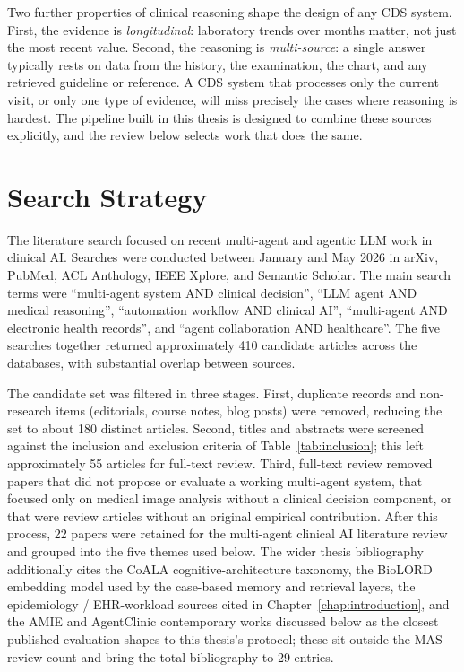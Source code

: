 Two further properties of clinical reasoning shape the design of any CDS
system. First, the evidence is \emph{longitudinal}: laboratory trends over
months matter, not just the most recent value. Second, the reasoning is
\emph{multi-source}: a single answer typically rests on data from the history,
the examination, the chart, and any retrieved guideline or reference. A CDS
system that processes only the current visit, or only one type of evidence,
will miss precisely the cases where reasoning is hardest. The pipeline built
in this thesis is designed to combine these sources explicitly, and the
review below selects work that does the same.

\FloatBarrier
\section{Search Strategy}
\label{sec:search}

The literature search focused on recent multi-agent and agentic LLM work in
clinical AI. Searches were conducted between January and May 2026 in arXiv,
PubMed, ACL Anthology, IEEE Xplore, and Semantic Scholar. The main search
terms were ``multi-agent system AND clinical decision'', ``LLM agent AND
medical reasoning'', ``automation workflow AND clinical AI'', ``multi-agent
AND electronic health records'', and ``agent collaboration AND healthcare''.
The five searches together returned approximately 410 candidate articles
across the databases, with substantial overlap between sources.

The candidate set was filtered in three stages. First, duplicate records and
non-research items (editorials, course notes, blog posts) were removed,
reducing the set to about 180 distinct articles. Second, titles and abstracts
were screened against the inclusion and exclusion criteria of
Table~\ref{tab:inclusion}; this left approximately 55 articles for full-text
review. Third, full-text review removed papers that did not propose or
evaluate a working multi-agent system, that focused only on medical image
analysis without a clinical decision component, or that were review articles
without an original empirical contribution. After this process, 22 papers
were retained for the multi-agent clinical AI literature review and
grouped into the five themes used below. The wider thesis bibliography
additionally cites the CoALA cognitive-architecture taxonomy, the
BioLORD embedding model used by the case-based memory and retrieval
layers, the epidemiology / EHR-workload sources cited in
Chapter~\ref{chap:introduction}, and the AMIE and AgentClinic
contemporary works discussed below as the closest published evaluation
shapes to this thesis's protocol; these sit outside the MAS review
count and bring the total bibliography to 29 entries.

